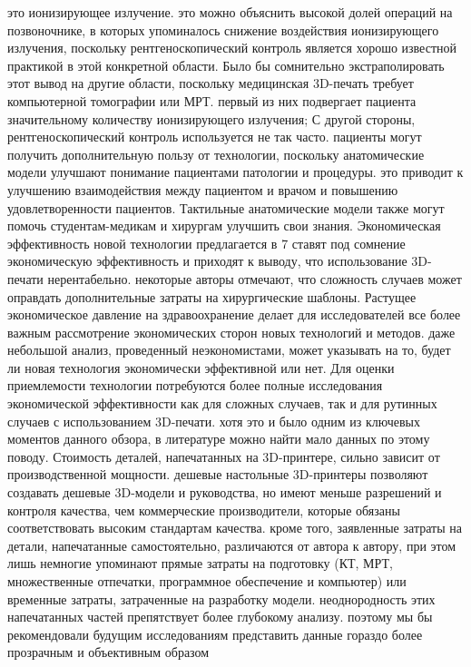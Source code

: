 это ионизирующее излучение. это можно объяснить высокой долей операций на
позвоночнике, в которых упоминалось снижение воздействия ионизирующего
излучения, поскольку рентгеноскопический контроль является хорошо известной
практикой в ​​​​этой конкретной области. Было бы сомнительно
экстраполировать этот вывод на другие области, поскольку медицинская 3D-печать
требует компьютерной томографии или МРТ. первый из них подвергает пациента
значительному количеству ионизирующего излучения; С другой стороны,
рентгеноскопический контроль используется не так часто. пациенты могут получить
дополнительную пользу от технологии, поскольку анатомические модели улучшают
понимание пациентами патологии и процедуры. это приводит к улучшению
взаимодействия между пациентом и врачом и повышению удовлетворенности пациентов.
Тактильные анатомические модели также могут помочь студентам-медикам и хирургам
улучшить свои знания. Экономическая эффективность новой технологии предлагается
в 7%
ставят под сомнение экономическую эффективность и приходят к выводу, что
использование 3D-печати нерентабельно. некоторые авторы отмечают, что сложность
случаев может оправдать дополнительные затраты на хирургические шаблоны.
Растущее экономическое давление на здравоохранение делает для исследователей все
более важным рассмотрение экономических сторон новых технологий и методов. даже
небольшой анализ, проведенный неэкономистами, может указывать на то, будет ли
новая технология экономически эффективной или нет. Для оценки приемлемости
технологии потребуются более полные исследования экономической эффективности как
для сложных случаев, так и для рутинных случаев с использованием 3D-печати. хотя
это и было одним из ключевых моментов данного обзора, в литературе можно найти
мало данных по этому поводу. Стоимость деталей, напечатанных на 3D-принтере,
сильно зависит от производственной мощности. дешевые настольные 3D-принтеры
позволяют создавать дешевые 3D-модели и руководства, но имеют меньше разрешений
и контроля качества, чем коммерческие производители, которые обязаны
соответствовать высоким стандартам качества. кроме того, заявленные затраты на
детали, напечатанные самостоятельно, различаются от автора к автору, при этом
лишь немногие упоминают прямые затраты на подготовку (КТ, МРТ, множественные
отпечатки, программное обеспечение и компьютер) или временные затраты,
затраченные на разработку модели. неоднородность этих напечатанных частей
препятствует более глубокому анализу. поэтому мы бы рекомендовали будущим
исследованиям представить данные гораздо более прозрачным и объективным образом

